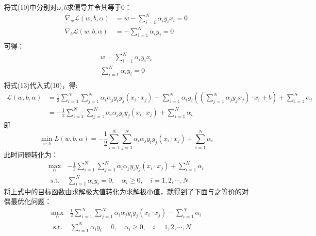 \documentclass{progartcn}
\begin{document}
将式(10)中分别对$\omega,b$求偏导并令其等于0：
\begin{equation}
	\begin{aligned}
		\nabla_{w} \mathcal{L}(w, b, \alpha)&=w-\sum_{i=1}^{N} \alpha_{i} y_{i} x_{i}=0 \\
		\nabla_{b} \mathcal{L}(w, b, \alpha)&= -\sum_{i=1}^{N} \alpha_{i} y_{i} =0 \\
	\end{aligned}
\end{equation}
可得：
\begin{equation}
	\begin{aligned}
		w = \sum_{i=1}^{N} \alpha_{i} y_{i} x_{i} \\ 
		\sum_{i=1}^{N} \alpha_{i} y_{i} =0 \\
	\end{aligned}
\end{equation}
将式(13)代入式(10)，得:
\begin{equation}
	\begin{aligned}
		\mathcal{L}(w, b, \alpha) &=\frac{1}{2} \sum_{i=1}^{N} \sum_{j=1}^{N} \alpha_{i} \alpha_{j} y_{i} y_{j}\left(x_{i} \cdot x_{j}\right)-\sum_{i=1}^{N} \alpha_{i} y_{i}\left(\left(\sum_{j=1}^{N} \alpha_{j} y_{j} x_{j}\right) \cdot x_{i}+b\right)+\sum_{i=1}^{N} \alpha_{i} \\
		&=-\frac{1}{2} \sum_{i=1}^{N} \sum_{j=1}^{N} \alpha_{i} \alpha_{j} y_{i} y_{j}\left(x_{i} \cdot x_{j}\right)+\sum_{i=1}^{N} \alpha_{i}
	\end{aligned}
\end{equation}
即
\begin{equation}
	\min _{w, b} L(w, b, \alpha)=-\frac{1}{2} \sum_{i=1}^{N} \sum_{j=1}^{N} \alpha_{i} \alpha_{j} y_{i} y_{j}\left(x_{i} \cdot x_{j}\right)+\sum_{i=1}^{N} \alpha_{i}
\end{equation}
此时问题转化为：
\begin{equation}
	\begin{aligned}
		\max _{\alpha} & -\frac{1}{2} \sum_{i=1}^{N} \sum_{j=1}^{N} \alpha_{i} \alpha_{j} y_{i} y_{j}\left(x_{i} \cdot x_{j}\right)+\sum_{i=1}^{N} \alpha_{i} \\
	\text { s.t. } & \sum_{i=1}^{N} \alpha_{i} y_{i}=0 ,\quad\alpha_{i} \geq 0, \quad i=1,2, \cdots, N
		\end{aligned}
\end{equation}
将上式中的目标函数由求解极大值转化为求解极小值，就得到了下面与之等价的对偶最优化问题：
\begin{equation}
	\begin{aligned}
		\max _{\alpha} & \frac{1}{2} \sum_{i=1}^{N} \sum_{j=1}^{N} \alpha_{i} \alpha_{j} y_{i} y_{j}\left(x_{i} \cdot x_{j}\right)-\sum_{i=1}^{N} \alpha_{i} \\
		\text { s.t. } & \sum_{i=1}^{N} \alpha_{i} y_{i}=0 ,\quad\alpha_{i} \geq 0, \quad i=1,2, \cdots, N
	\end{aligned}
\end{equation}
\end{document}
